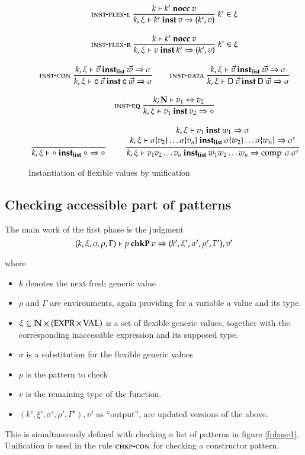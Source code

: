 \begin{figure}[htp]
\begin{gather*}
\mbox{\sc inst-flex-l}\ \dfrac{k\vdash k'\mbox{ \textbf{nocc} }v}{k,\xi\vdash k'\:\mathbf{inst}\:v\Rightarrow (k',v)}
{\; k' \in \xi }
\\[2ex]
\mbox{\sc inst-flex-r}\ \dfrac{k\vdash k'\mbox{ \textbf{nocc} }v}{k,\xi\vdash v\:\mathbf{inst}\:k'\Rightarrow (k',v)}
{\; k' \in \xi}
\\[2ex]
\mbox{\sc inst-con}\ \dfrac{{k,\xi\vdash\vec{v}\:\mathbf{inst_{list}}\:\vec{w}\Rightarrow \sigma}}{k,\xi\vdash\mathsf{c} \: \vec{v}\:\mathbf{inst}\:\mathsf{c} \: \vec{w}\Rightarrow \sigma
}
\qquad
\mbox{\sc inst-data}\ \dfrac{{k,\xi\vdash\vec{v}\:\mathbf{inst_{list}}\:\vec{w}\Rightarrow \sigma}}{k,\xi\vdash\mathsf{D} \: \vec{v}\:\mathbf{inst}\:\mathsf{D} \: \vec{w}\Rightarrow \sigma
}
\\[2ex]
\mbox{\sc inst-eq}\ \dfrac{k;\mathbf{N}\vdash v_1\Leftrightarrow v_2}{k,\xi\vdash v_1\:\mathbf{inst}\:v_2\Rightarrow \diamond
}
\\[2ex]
\ \dfrac{}{k,\xi\vdash\diamond\:\mathbf{inst_{list}}\:\diamond\Rightarrow \diamond}
\qquad
\ \dfrac{\begin{array}[b]{c}k,\xi\vdash v_1\:\mathbf{inst}\:w_1\Rightarrow \sigma\\k,\xi\vdash\sigma\{v_2\} \ldots \sigma\{v_n\}\:\mathbf{inst_{list}}\:\sigma\{w_2\} \ldots \sigma\{w_n\}\Rightarrow \sigma'\end{array}}{k,\xi\vdash v_1 v_2 \ldots v_n\:\mathbf{inst_{list}}\:w_1 w_2 \ldots w_n\Rightarrow \operatorname{comp}\:\sigma\:\sigma'}
\end{gather*}
\caption{Instantiation of flexible values by unification}
\label{finst}
\end{figure}

\subsection{Checking accessible part of patterns}

The main work of the first phase is the judgment 
\[
(k,\xi,\sigma,\rho,\Gamma)\vdash p\:\mathbf{chkP}\:v\Rightarrow (k',\xi',\sigma',\rho',\Gamma'),v'
\]

where
\begin{itemize}
\item
$k$ denotes the next fresh generic value
\item
$\rho$ and $\Gamma$ are environments, again providing for a variable a value and its type.
\item
$\xi \subseteq \mathbb{N} \times (\operatorname{EXPR} \times \operatorname{VAL})$ is a set of flexible generic values, together with the corresponding inaccessible expression and its supposed type.
\item
$\sigma$ is a substitution for the flexible generic values
\item
$p$ is the pattern to check
\item
$v$ is the remaining type of the function.
\item
$(k',\xi',\sigma',\rho',\Gamma'),v'$ as ``output'', are updated versions of the above.
\end{itemize}
This is simultaneously defined with checking a list of patterns in figure \ref{fphase1}. 
Unification is used in the rule $\mbox{\sc chkp-con}$ for checking a constructor pattern.


